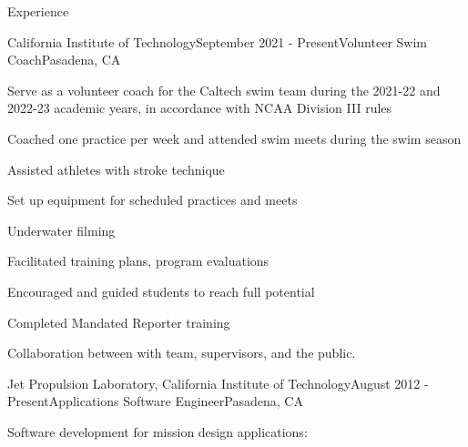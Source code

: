 \documentclass{resume} %
\begin{document}





\begin{rSection}{Experience}

\begin{rSubsection}{California Institute of Technology}{September 2021 - Present}{Volunteer Swim Coach}{Pasadena, CA}
\item  Serve as a volunteer coach for the Caltech swim team during the 2021-22 and 2022-23 academic years, in accordance with NCAA Division III rules

\item Coached one practice per week and attended swim meets during the swim season

\item Assisted athletes with stroke technique
\item Set up equipment for scheduled practices and meets
\item Underwater filming
\item Facilitated training plans, program evaluations
\item Encouraged and guided students to reach full potential

\item Completed Mandated Reporter training

\item Collaboration between with team, supervisors, and the public.

\begin{rSubsection}{Jet Propulsion Laboratory, California Institute of Technology}{August 2012 - Present}{Applications Software Engineer}{Pasadena, CA}

\item Software development for mission design applications:


\end{rSubsection}
\end{rSubsection}
\end{rSection}
\end{document}
